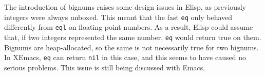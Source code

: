 \documentclass[format=acmsmall, review=false, screen=true]{acmart}
\newcommand \Elisp {Elisp}
\begin{document}
The introduction of bignums raises some design issues in \Elisp, as
previously integers were always unboxed.  This meant that the fast
\texttt{eq} only behaved differently from \texttt{eql} on floating point
numbers.  As a result, \Elisp{} could assume that, if two integers
represented the same number, \texttt{eq} would return true on them.
Bignums are heap-allocated, so the same is not necessarily true for two
bignums.  In XEmacs, \texttt{eq} can return \texttt{nil} in this case, and
this seems to have caused no serious problems.
This issue is still being discussed with Emacs.











\end{document}
